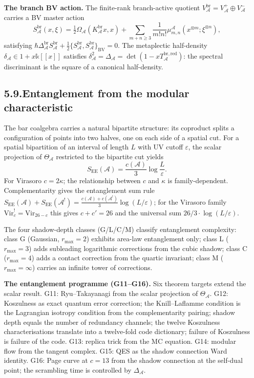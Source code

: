 \documentclass[11pt,reqno]{amsart}
\theoremstyle{definition}
\theoremstyle{remark}
\providecommand{\cA}{\mathcal{A}}
\providecommand{\Bbbk}{\mathbb{k}}
\numberwithin{equation}{section}
\begin{document}
\medskip
\noindent\textbf{The branch BV action.}\enspace
The finite-rank branch-active quotient
$V_\cA^{\mathrm{br}}=V_\cA^+\oplus V_\cA^-$ carries a BV master action
\[
S_\cA^{\mathrm{br}}(x,\xi)=\tfrac12\Omega_\cA(K_\cA^{\mathrm{br}}x,x)+\sum_{m+n\ge 3}\frac{1}{m!n!}\mu_{m,n}^\cA(x^{\otimes m};\xi^{\otimes n}),
\]
satisfying
$\hbar\Delta_\cA^{\mathrm{br}}S_\cA^{\mathrm{br}}+\tfrac12\{S_\cA^{\mathrm{br}},S_\cA^{\mathrm{br}}\}_{\mathrm{BV}}=0$.
The metaplectic half-density $\delta_\cA\in 1+x\Bbbk[[x]]$ satisfies
$\delta_\cA^2=\Delta_\cA=\det(1-xT_\cA^{\mathrm{br,red}})$: the
spectral discriminant is the square of a canonical half-density.

\subsection*{5.9.\enspace Entanglement from the modular characteristic}

The bar coalgebra carries a natural bipartite structure: its coproduct
splits a configuration of points into two halves, one on each side of
a spatial cut. For a spatial bipartition of an interval of length $L$
with UV cutoff $\varepsilon$, the scalar projection of $\Theta_\cA$
restricted to the bipartite cut yields
\[
S_{\mathrm{EE}}(\cA)=\frac{c(\cA)}{3}\log\frac{L}{\varepsilon}.
\]
For Virasoro $c=2\kappa$; the relationship between $c$ and $\kappa$
is family-dependent. Complementarity gives the entanglement sum rule
$S_{\mathrm{EE}}(\cA)+S_{\mathrm{EE}}(\cA^!)=\tfrac{c(\cA)+c(\cA^!)}{3}\log(L/\varepsilon)$;
for the Virasoro family $\mathrm{Vir}_c^!=\mathrm{Vir}_{26-c}$ this
gives $c+c'=26$ and the universal sum $26/3\cdot\log(L/\varepsilon)$.

The four shadow-depth classes (G/L/C/M) classify entanglement
complexity: class G (Gaussian, $r_{\max}=2$) exhibits area-law
entanglement only; class L ($r_{\max}=3$) adds subleading logarithmic
corrections from the cubic shadow; class C ($r_{\max}=4$) adds a
contact correction from the quartic invariant; class M
($r_{\max}=\infty$) carries an infinite tower of corrections.

\medskip
\noindent\textbf{The entanglement programme (G11--G16).}\enspace
Six theorem targets extend the scalar result. G11: Ryu--Takayanagi
from the scalar projection of $\Theta_\cA$. G12: Koszulness as exact
quantum error correction; the Knill--Laflamme condition is the
Lagrangian isotropy condition from the complementarity pairing;
shadow depth equals the number of redundancy channels; the twelve
Koszulness characterisations translate into a twelve-fold code
dictionary; failure of Koszulness is failure of the code. G13:
replica trick from the MC equation. G14: modular flow from the
tangent complex. G15: QES as the shadow connection Ward identity.
G16: Page curve at $c=13$ from the shadow connection at the self-dual
point; the scrambling time is controlled by $\Delta_\cA$.
\end{document}
